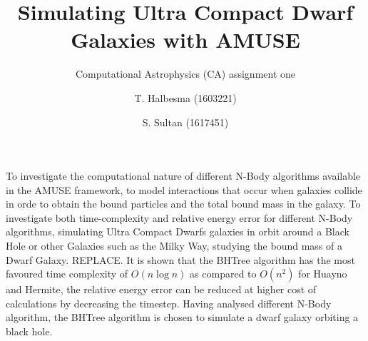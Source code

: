 \documentclass{aa}
\begin{document}
 


   \title{Simulating Ultra Compact Dwarf Galaxies with AMUSE}

   \subtitle{Computational Astrophysics (CA) assignment one}

   \author{T. Halbesma (1603221)
          \and
          S. Sultan (1617451)
          }



 
  \abstract
   {To investigate the computational nature of different N-Body algorithms
   available in the AMUSE framework, to model interactions that occur 
   when galaxies collide in orde to obtain the bound particles and the total
   bound mass in the galaxy.}
   {To investigate both time-complexity and relative energy error for different 
   N-Body algorithms, simulating Ultra Compact Dwarfs galaxies in orbit around
   a Black Hole or other Galaxies such as the Milky Way, studying the bound mass
   of a Dwarf Galaxy.}
   {REPLACE.}
   {It is shown that the BHTree algorithm has the most favoured time complexity
   of $O(n \log n)$ as compared to $O(n^2)$ for Huayno and Hermite, the
   relative energy error can be reduced at higher cost of calculations by decreasing
   the timestep. Having analysed different N-Body algorithm, the BHTree algorithm 
   is chosen to simulate a dwarf galaxy orbiting a black hole.}
   {}


   \maketitle
%
\end{document}

